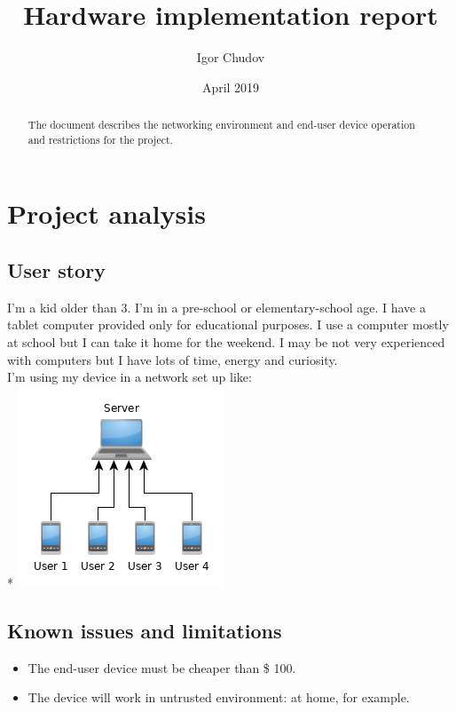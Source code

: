 \documentclass[a4paper, sans, booktabs, totpages, english]{report}
\begin{document}
\title{Hardware implementation report}
\author{Igor Chudov}
\date{April 2019}
\maketitle


\begin{abstract}
The document describes the networking environment and end-user device
operation and restrictions for the project.
\end{abstract}

\part{Project analysis}

\chapter{User story}

I'm a kid older than 3. I'm in a pre-school or elementary-school age. I
have a tablet computer provided only for educational purposes. I use a
computer mostly at school but I can take it home for the weekend. I may
be not very experienced with computers but I have lots of time, energy
and curiosity. \\

\noindent
I'm using my device in a network set up like: \\*
\includegraphics{school.png}


\chapter{Known issues and limitations}

\begin{itemize}
\item The end-user device must be cheaper than \$ 100.
\item The device will work in untrusted environment: at home, for example.
\end{itemize}
\end{document}
